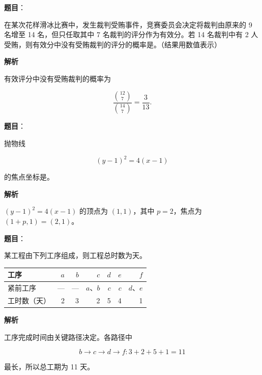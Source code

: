 \begin{answer}

\textbf{题目}：

在某次花样滑冰比赛中，发生裁判受贿事件，竞赛委员会决定将裁判由原来的 9 名增至 14 名，但只任取其中 7 名裁判的评分作为有效分。若 14 名裁判中有 2 人受贿，则有效分中没有受贿裁判的评分的概率是\gkblank{}。（结果用数值表示）

\textbf{解析}

有效评分中没有受贿裁判的概率为

\nopagebreak[4]
\[
\frac{\binom{12}{7}}{\binom{14}{7}}=\frac3{13}.
\]


\end{answer}
\begin{answer}

\textbf{题目}：

抛物线

\nopagebreak[4]
\[
(y-1)^2=4(x-1)
\]

的焦点坐标是\gkblank{}。

\textbf{解析}

$(y-1)^2=4(x-1)$ 的顶点为 $(1,1)$，其中 $p=2$，焦点为 $(1+p,1)=(2,1)$。


\end{answer}
\begin{answer}

\textbf{题目}：

某工程由下列工序组成，则工程总时数为\gkblank{}天。

\begin{center}
\begin{tabular}{lrrrrrr}
\toprule
工序 & $a$ & $b$ & $c$ & $d$ & $e$ & $f$ \\
\midrule
紧前工序 & — & — & $a\text{、}b$ & $c$ & $c$ & $d\text{、}e$ \\
工时数（天） & 2 & 3 & 2 & 5 & 4 & 1 \\
\bottomrule
\end{tabular}
\end{center}

\textbf{解析}

工序完成时间由关键路径决定。各路径中

\nopagebreak[4]
\[
b\to c\to d\to f:3+2+5+1=11
\]

最长，所以总工期为 11 天。


\end{answer}
